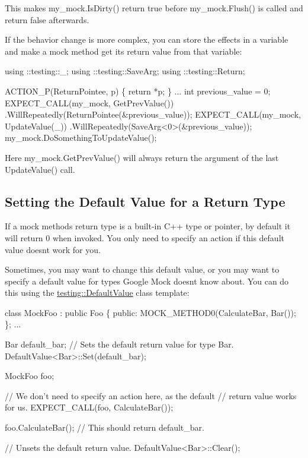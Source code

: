 This makes {\ttfamily my\+\_\+mock.\+Is\+Dirty()} return {\ttfamily true} before {\ttfamily my\+\_\+mock.\+Flush()} is called and return {\ttfamily false} afterwards.

If the behavior change is more complex, you can store the effects in a variable and make a mock method get its return value from that variable\+:


\begin{DoxyCode}
using ::testing::\_;
using ::testing::SaveArg;
using ::testing::Return;

ACTION\_P(ReturnPointee, p) \{ return *p; \}
...
  int previous\_value = 0;
  EXPECT\_CALL(my\_mock, GetPrevValue())
      .WillRepeatedly(ReturnPointee(&previous\_value));
  EXPECT\_CALL(my\_mock, UpdateValue(\_))
      .WillRepeatedly(SaveArg<0>(&previous\_value));
  my\_mock.DoSomethingToUpdateValue();
\end{DoxyCode}


Here {\ttfamily my\+\_\+mock.\+Get\+Prev\+Value()} will always return the argument of the last {\ttfamily Update\+Value()} call.

\subsection*{Setting the Default Value for a Return Type}

If a mock method\textquotesingle{}s return type is a built-\/in C++ type or pointer, by default it will return 0 when invoked. You only need to specify an action if this default value doesn\textquotesingle{}t work for you.

Sometimes, you may want to change this default value, or you may want to specify a default value for types Google Mock doesn\textquotesingle{}t know about. You can do this using the {\ttfamily \hyperlink{classtesting_1_1DefaultValue}{testing\+::\+Default\+Value}} class template\+:


\begin{DoxyCode}
class MockFoo : public Foo \{
 public:
  MOCK\_METHOD0(CalculateBar, Bar());
\};
...

  Bar default\_bar;
  // Sets the default return value for type Bar.
  DefaultValue<Bar>::Set(default\_bar);

  MockFoo foo;

  // We don't need to specify an action here, as the default
  // return value works for us.
  EXPECT\_CALL(foo, CalculateBar());

  foo.CalculateBar();  // This should return default\_bar.

  // Unsets the default return value.
  DefaultValue<Bar>::Clear();
\end{DoxyCode}


